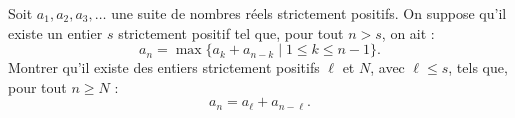 Soit $a_1, a_2, a_3, \ldots$ une suite de nombres réels strictement positifs. On suppose qu'il existe un
entier $s$ strictement positif tel que, pour tout $n > s$, on ait :
\[
a_n = \max\{a_k + a_{n-k} \mid 1 \leqslant k \leqslant n - 1\}.
\]
Montrer qu'il existe des entiers strictement positifs $\ell$ et $N$, avec $\ell \leqslant s$, tels que, pour
tout $n \geqslant N$ :
\[
a_n = a_\ell + a_{n-\ell}.
\]
